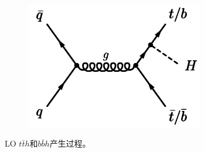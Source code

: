 \begin{figure}[h]
\begin{subfigure}[b]{0.33\textwidth}
  \caption{}
 \end{subfigure}
 \begin{subfigure}[b]{0.33\textwidth}
  \includegraphics[width=0.85\textwidth]{fig/diagram_tth3_LO.png}
  \caption{}
 \end{subfigure}
\caption{LO $t\bar{t}h$和$b\bar{b}h$产生过程。}
\label{fig:diagram_tth}
\end{figure}

